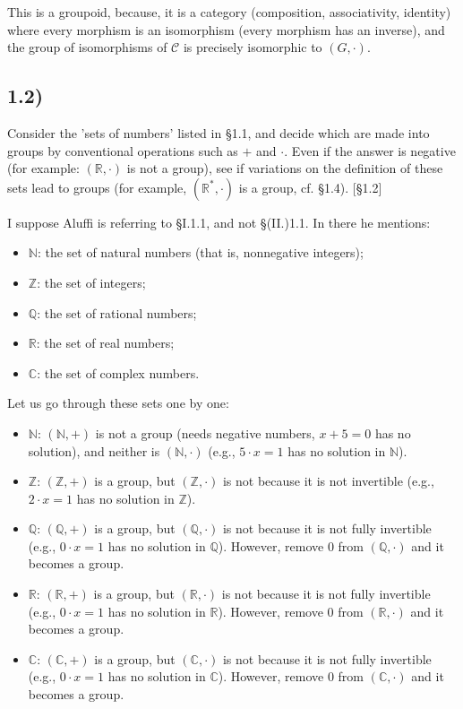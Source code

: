 \documentclass[12pt, letterpaper, twoside]{report}
\begin{document}
This is a groupoid, because, it is a category (composition, associativity, identity) where every morphism is an isomorphism (every morphism has an inverse), and the group of isomorphisms of $\mathcal{C}$ is precisely isomorphic to $(G, \cdot)$.


\subsection*{1.2)}

Consider the 'sets of numbers' listed in §1.1, and decide which are made into groups by conventional operations such as $+$ and $\cdot$. Even if the answer is negative (for example: $(\mathbb{R}, \cdot)$ is not a group), see if variations on the definition of these sets lead to groups (for example, $(\mathbb{R}^*, \cdot)$ is a group, cf. §1.4). [§1.2]

I suppose Aluffi is referring to §I.1.1, and not §(II.)1.1. In there he mentions:

\begin{itemize}
	\item $\mathbb{N}$: the set of natural numbers (that is, nonnegative integers);
	\item $\mathbb{Z}$: the set of integers;
	\item $\mathbb{Q}$: the set of rational numbers;
	\item $\mathbb{R}$: the set of real numbers;
	\item $\mathbb{C}$: the set of complex numbers.
\end{itemize}

Let us go through these sets one by one:

\begin{itemize}
	\item $\mathbb{N}$: $(\mathbb{N}, +)$ is not a group (needs negative numbers, $x + 5 = 0$ has no solution), and neither is $(\mathbb{N}, \cdot)$ (e.g., $5 \cdot x = 1$ has no solution in $\mathbb{N}$).
	\item $\mathbb{Z}$: $(\mathbb{Z}, +)$ is a group, but $(\mathbb{Z}, \cdot)$ is not because it is not invertible (e.g., $2 \cdot x = 1$ has no solution in $\mathbb{Z}$).
	\item $\mathbb{Q}$: $(\mathbb{Q}, +)$ is a group, but $(\mathbb{Q}, \cdot)$ is not because it is not fully invertible (e.g., $0 \cdot x = 1$ has no solution in $\mathbb{Q}$). However, remove $0$ from $(\mathbb{Q}, \cdot)$ and it becomes a group.
	\item $\mathbb{R}$: $(\mathbb{R}, +)$ is a group, but $(\mathbb{R}, \cdot)$ is not because it is not fully invertible (e.g., $0 \cdot x = 1$ has no solution in $\mathbb{R}$). However, remove $0$ from $(\mathbb{R}, \cdot)$ and it becomes a group.
	\item $\mathbb{C}$: $(\mathbb{C}, +)$ is a group, but $(\mathbb{C}, \cdot)$ is not because it is not fully invertible (e.g., $0 \cdot x = 1$ has no solution in $\mathbb{C}$). However, remove $0$ from $(\mathbb{C}, \cdot)$ and it becomes a group.
\end{itemize}
\end{document}
